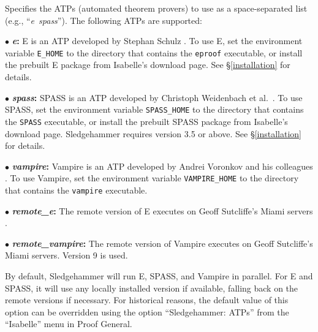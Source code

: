 \documentclass[a4paper,12pt]{article}
\begin{document}
\begin{enum}

Specifies the ATPs (automated theorem provers) to use as a space-separated list
(e.g., ``\textit{e}~\textit{spass}''). The following ATPs are supported:

\begin{enum}
\item[$\bullet$] \textbf{\textit{e}:} E is an ATP developed by Stephan Schulz
\cite{schulz-2002}. To use E, set the environment variable
\texttt{E\_HOME} to the directory that contains the \texttt{eproof} executable,
or install the prebuilt E package from Isabelle's download page. See
\S\ref{installation} for details.

\item[$\bullet$] \textbf{\textit{spass}:} SPASS is an ATP developed by Christoph
Weidenbach et al.\ \cite{weidenbach-et-al-2009}. To use SPASS, set the
environment variable \texttt{SPASS\_HOME} to the directory that contains the
\texttt{SPASS} executable, or install the prebuilt SPASS package from Isabelle's
download page. Sledgehammer requires version 3.5 or above. See
\S\ref{installation} for details.

\item[$\bullet$] \textbf{\textit{vampire}:} Vampire is an ATP developed by
Andrei Voronkov and his colleagues \cite{riazanov-voronkov-2002}. To use
Vampire, set the environment variable \texttt{VAMPIRE\_HOME} to the directory
that contains the \texttt{vampire} executable.

\item[$\bullet$] \textbf{\textit{remote\_e}:} The remote version of E executes
on Geoff Sutcliffe's Miami servers \cite{sutcliffe-2000}.

\item[$\bullet$] \textbf{\textit{remote\_vampire}:} The remote version of
Vampire executes on Geoff Sutcliffe's Miami servers. Version 9 is used.

\end{enum}

By default, Sledgehammer will run E, SPASS, and Vampire in parallel. For E and
SPASS, it will use any locally installed version if available, falling back
on the remote versions if necessary. For historical reasons, the default value
of this option can be overridden using the option ``Sledgehammer: ATPs'' from
the ``Isabelle'' menu in Proof General.


\end{enum}
\end{document}
